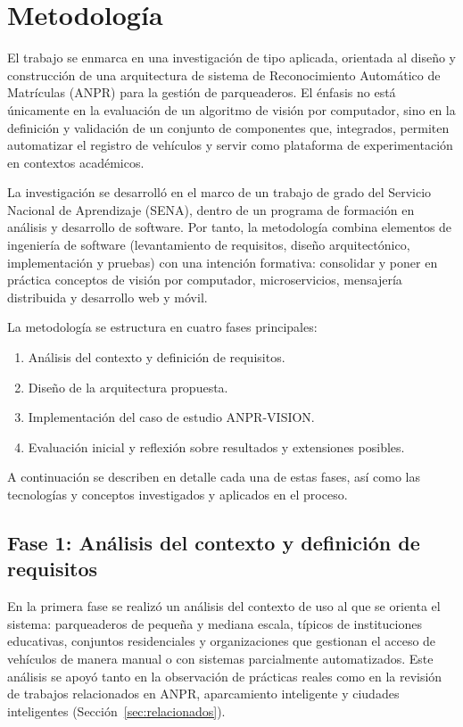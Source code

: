 \section{Metodología}
\label{sec:metodologia}

El trabajo se enmarca en una investigación de tipo aplicada, orientada al diseño y construcción de una arquitectura de sistema de Reconocimiento Automático de Matrículas (ANPR) para la gestión de parqueaderos. El énfasis no está únicamente en la evaluación de un algoritmo de visión por computador, sino en la definición y validación de un conjunto de componentes que, integrados, permiten automatizar el registro de vehículos y servir como plataforma de experimentación en contextos académicos.

La investigación se desarrolló en el marco de un trabajo de grado del Servicio Nacional de Aprendizaje (SENA), dentro de un programa de formación en análisis y desarrollo de software. Por tanto, la metodología combina elementos de ingeniería de software (levantamiento de requisitos, diseño arquitectónico, implementación y pruebas) con una intención formativa: consolidar y poner en práctica conceptos de visión por computador, microservicios, mensajería distribuida y desarrollo web y móvil.

La metodología se estructura en cuatro fases principales:

\begin{enumerate}
    \item Análisis del contexto y definición de requisitos.
    \item Diseño de la arquitectura propuesta.
    \item Implementación del caso de estudio ANPR-VISION.
    \item Evaluación inicial y reflexión sobre resultados y extensiones posibles.
\end{enumerate}

A continuación se describen en detalle cada una de estas fases, así como las tecnologías y conceptos investigados y aplicados en el proceso.

\subsection{Fase 1: Análisis del contexto y definición de requisitos}

En la primera fase se realizó un análisis del contexto de uso al que se orienta el sistema: parqueaderos de pequeña y mediana escala, típicos de instituciones educativas, conjuntos residenciales y organizaciones que gestionan el acceso de vehículos de manera manual o con sistemas parcialmente automatizados. Este análisis se apoyó tanto en la observación de prácticas reales como en la revisión de trabajos relacionados en ANPR, aparcamiento inteligente y ciudades inteligentes (Sección~\ref{sec:relacionados}).

